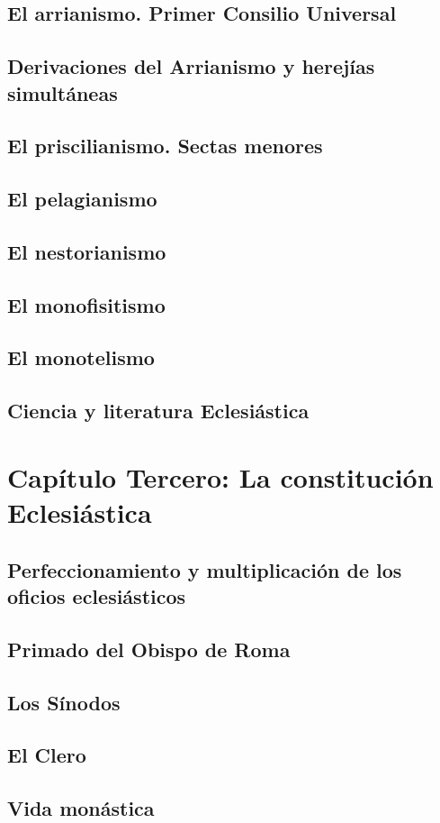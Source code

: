 \raggedbottom{} \documentclass[12pt, a4paper]{book}
\begin{document}
\section{El arrianismo. Primer Consilio Universal}
\section{Derivaciones del Arrianismo y herejías simultáneas}
\section{El priscilianismo. Sectas menores}
\section{El pelagianismo}
\section{El nestorianismo}
\section{El monofisitismo}
\section{El monotelismo}
\section{Ciencia y literatura Eclesiástica}
\chapter{Capítulo Tercero: La constitución Eclesiástica}
\section{Perfeccionamiento y multiplicación de los oficios eclesiásticos}
\section{Primado del Obispo de Roma}
\section{Los Sínodos}
\section{El Clero}
\section{Vida monástica}
\end{document}
